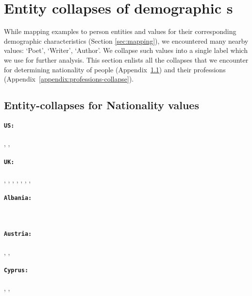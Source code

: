 \section{Entity collapses of demographic \demorow{}s}
While mapping \qa{} examples to person entities and values for their corresponding demographic characteristics (Section \ref{sec:mapping}), we encountered many nearby values: `Poet', `Writer', `Author'. We collapse such values into a single label which we use for further analysis. This section enlists all the collapses that we encounter for determining nationality of people (Appendix~\ref{appendix:country-collapse}) and their professions (Appendix~\ref{appendix:professions-collapse}).

\subsection{Entity-collapses for Nationality values}
\label{appendix:country-collapse}

\paragraph{\textbf{\texttt{US:}}}
, , \\
\paragraph{\textbf{\texttt{UK:}}}
, , , , , , , \\
\paragraph{\textbf{\texttt{Albania:}}}
\\
\paragraph{\textbf{\texttt{Austria:}}}
, , \\
\paragraph{\textbf{\texttt{Cyprus:}}}
, , \\
